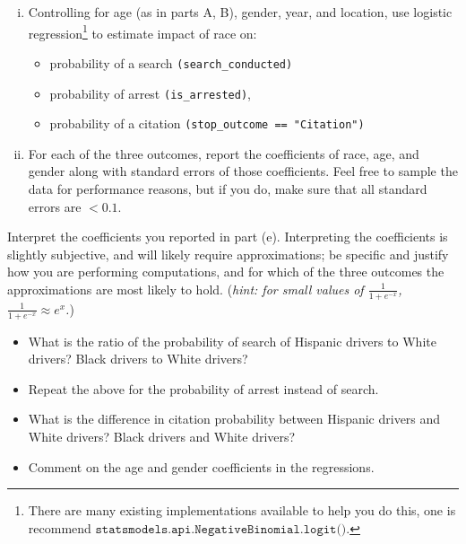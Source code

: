 \documentclass[preview]{standalone}
\begin{document}
\begin{Parts}
\begin{enumerate}[(i)]
\item Controlling for age (as in parts A, B), gender, year, and location, use logistic regression\footnote{There are many existing implementations available to help you do this, one is recommend $\texttt{statsmodels.api.NegativeBinomial.logit()}$.} to estimate impact of race on:
\begin{itemize}
\item probability of a search \texttt{(search\_conducted)}
\item probability of arrest \texttt{(is\_arrested)},
\item probability of a citation \texttt{(stop\_outcome == "Citation")}
\end{itemize}
\item For each of the three outcomes, report the coefficients of race, age, and gender along with standard errors of those coefficients. Feel free to sample the data for performance reasons, but if you do, make sure that all standard errors are $< 0.1$.
\end{enumerate}


\Part Interpret the coefficients you reported in part (e). Interpreting the coefficients is slightly subjective, and will likely require approximations; be specific and justify how you are performing computations, and for which of the three outcomes the approximations are most likely to hold. (\textit{hint: for small values of $\frac{1}{1+e^{-x}}$, 
$\frac{1}{1+e^{-x}} \approx e^{x}$.})



\begin{itemize}
\item What is the ratio of the probability of search of Hispanic drivers to White drivers? Black drivers to White drivers? \\

\item Repeat the above for the probability of arrest instead of search. \\

\item What is the difference in citation probability between Hispanic drivers and White drivers? Black drivers and White drivers? \\

\item Comment on the age and gender coefficients in the regressions. \\




\end{itemize}
\end{Parts}
\end{document}

